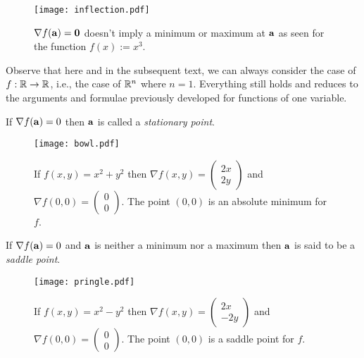 \begin{figure}[htb]
    \begin{center}
        \texttt{[image: inflection.pdf]}
        \caption{\(\nabla f(\aa) =  \mathbf{0}\) doesn't imply a minimum or maximum at \(\aa\) as seen for the function \(f(x):=x^3\).}
    \end{center}
\end{figure}

Observe that here and in the subsequent text, we can always consider the case of \(f:\bR \to \bR\), i.e., the case of \(\bR^n\) where \(n=1\).
Everything still holds and reduces to the arguments and formulae previously developed for functions of one variable.


\begin{definition}
    If \(\nabla f(\aa)=0\) then \(\aa\) is called a \emph{stationary point}.
\end{definition}


\begin{figure}[htb]
    \begin{center}
        \texttt{[image: bowl.pdf]}
        \caption{If \(f(x,y)=x^2+y^2\) then \(\nabla f(x,y) = \left(\begin{smallmatrix}
                2x\\2y
            \end{smallmatrix}\right)\) and \(\nabla f(0,0) =\left(\begin{smallmatrix}
                0\\0
            \end{smallmatrix}\right) \). The point \((0,0)\) is an absolute minimum for \(f\).}
    \end{center}
\end{figure}


\begin{definition}
    If \(\nabla f(\aa)=0\) and \(\aa\) is neither a minimum nor a maximum then \(\aa\) is said to be a \emph{saddle point}.
\end{definition}



\begin{figure}
    \begin{center}
        \texttt{[image: pringle.pdf]}
        \caption{If \(f(x,y)=x^2-y^2\) then \(\nabla f(x,y) = \left(\begin{smallmatrix}
                2x\\-2y
            \end{smallmatrix}\right)\) and \(\nabla f(0,0) =\left(\begin{smallmatrix}
                0\\0
            \end{smallmatrix}\right) \). The point \((0,0)\) is a saddle point for \(f\).}
    \end{center}
\end{figure}


